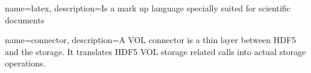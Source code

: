 \makeglossaries

{
        name=latex,
        description={Is a mark up language specially suited for 
scientific documents}
}
  
{
        name=connector,
        description={A VOL connector is a thin layer between HDF5 and the storage.
It translates HDF5 VOL storage related calls into actual storage operations.}
}



